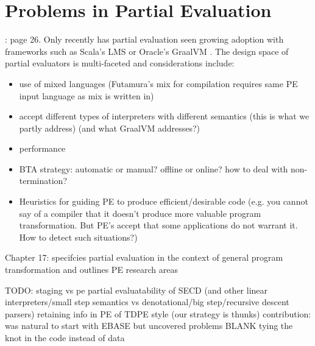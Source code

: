 \documentclass{article}
\theoremstyle{definition}
\begin{document}
\section{Problems in Partial Evaluation}
\cite{jones1993partial}: page 26. Only recently has partial evaluation seen growing adoption with frameworks such as Scala's LMS \cite{rompf2010lightweight} or Oracle's GraalVM \cite{wurthinger2013one}. The design space of partial evaluators is multi-faceted and considerations include:
\begin{itemize}
	\item use of mixed languages (Futamura's mix for compilation requires same PE input language as mix is written in)
	\item accept different types of interpreters with different semantics (this is what we partly address) (and what GraalVM addresses?)
	\item performance
	\item BTA strategy: automatic or manual? offline or online? how to deal with non-termination?
	\item Heuristics for guiding PE to produce efficient/desirable code (e.g. you cannot say of a compiler that it doesn't produce more valuable program transformation. But PE's accept that some applications do not warrant it. How to detect such situations?)
\end{itemize}

Chapter 17: specifcies partial evaluation in the context of general program transformation and outlines PE research areas

TODO:
staging vs pe
partial evaluatability of SECD (and other linear interpreters/small step semantics vs denotational/big step/recursive descent parsers)
retaining info in PE of TDPE style (our strategy is thunks)
contribution: was natural to start with EBASE but uncovered problems BLANK
tying the knot in the code instead of data



\end{document}
